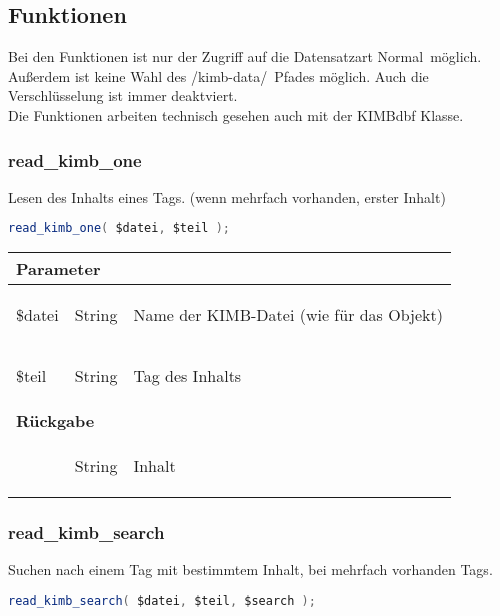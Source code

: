 \documentclass[paper=A4,pagesize=auto,12pt,headinclude=true,footinclude=true,BCOR=0mm,DIV=calc]{scrartcl}
\begin{document}
%
%
%
 \newpage
 \subsection{Funktionen}
 Bei den Funktionen ist nur der Zugriff auf die Datensatzart \glqq Normal\grqq ~möglich. Außerdem ist keine Wahl des \glqq/kimb-data/\grqq ~Pfades möglich. Auch die Verschlüsselung ist immer deaktviert.\\
 Die Funktionen arbeiten technisch gesehen auch mit der KIMBdbf Klasse.
  
  \subsubsection{read\_kimb\_one}
	    Lesen des Inhalts eines Tags. (wenn mehrfach vorhanden, erster Inhalt)
	    \begin{lstlisting}[gobble=4,language=Java]
	      read_kimb_one( $datei, $teil );
	    \end{lstlisting}
	    
	    \begin{tabular}{|lcp{}|}
		    \hline
		      \multicolumn{3}{|l|}{ \textbf{Parameter} } \\
		    \hline
		      \$datei & String & \begin{itshape} Name der KIMB-Datei (wie für das Objekt)\end{itshape} \\
		      \$teil & String & \begin{itshape} Tag des Inhalts \end{itshape} \\
		    \hline
		      \multicolumn{3}{|l|}{ \textbf{Rückgabe} } \\
		    \hline
			     & String & \begin{itshape} Inhalt \end{itshape} \\
		    \hline
	    \end{tabular}
	    
  \subsubsection{read\_kimb\_search}
	    Suchen nach einem Tag mit bestimmtem Inhalt, bei mehrfach vorhanden Tags.
	    \begin{lstlisting}[gobble=4,language=Java]
	      read_kimb_search( $datei, $teil, $search );
	    \end{lstlisting}
	    
\end{document}
